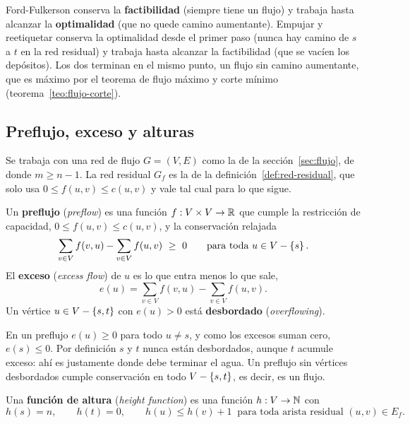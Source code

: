 \documentclass[11pt,letterpaper]{article}
\begin{document}
\begin{idea}
  Ford-Fulkerson conserva la \textbf{factibilidad} (siempre tiene un
  flujo) y trabaja hasta alcanzar la \textbf{optimalidad} (que no
  quede camino aumentante). Empujar y reetiquetar conserva la
  optimalidad desde el primer paso (nunca hay camino de $s$ a $t$ en
  la red residual) y trabaja hasta alcanzar la factibilidad (que se
  vacíen los depósitos). Los dos terminan en el mismo punto, un flujo
  sin camino aumentante, que es máximo por el teorema de flujo máximo
  y corte mínimo (teorema~\ref{teo:flujo-corte}).
\end{idea}


\subsection*{Preflujo, exceso y alturas}

Se trabaja con una red de flujo $G = (V, E)$ como la de la
sección~\ref{sec:flujo}, de donde $m \ge n - 1$. La red residual $G_f$
es la de la definición~\ref{def:red-residual}, que solo usa
$0 \le f(u, v) \le c(u, v)$ y vale tal cual para lo que sigue.

\begin{definicion}[Preflujo]
  \label{def:preflujo}
  Un \textbf{preflujo} (\textit{preflow}) es una función
  $f : V \times V \to \mathbb{R}$ que cumple la restricción de capacidad,
  $0 \le f(u, v) \le c(u, v)$, y la conservación relajada
  \[
    \sum_{v \in V} f(v, u) - \sum_{v \in V} f(u, v) \ \ge\ 0
    \qquad \text{para toda } u \in V - \left\{ s \right\} .
  \]
  El \textbf{exceso} (\textit{excess flow}) de $u$ es lo que entra
  menos lo que sale,
  \[
    e(u) = \sum_{v \in V} f(v, u) - \sum_{v \in V} f(u, v) .
  \]
  Un vértice $u \in V - \left\{ s, t \right\}$ con $e(u) > 0$ está
  \textbf{desbordado} (\textit{overflowing}).
\end{definicion}

En un preflujo $e(u) \ge 0$ para todo $u \neq s$, y como los excesos
suman cero, $e(s) \le 0$. Por definición $s$ y $t$ nunca están
desbordados, aunque $t$ acumule exceso: ahí es justamente donde debe
terminar el agua. Un preflujo sin vértices desbordados cumple
conservación en todo $V - \left\{ s, t \right\}$, es decir, es un flujo.

\begin{definicion}
  \label{def:altura-push}
  Una \textbf{función de altura} (\textit{height function}) es una
  función $h : V \to \mathbb{N}$ con
  \[
    h(s) = n , \qquad h(t) = 0 , \qquad
    h(u) \le h(v) + 1 \ \text{ para toda arista residual }
    (u, v) \in E_f .
  \]
\end{definicion}
\end{document}
